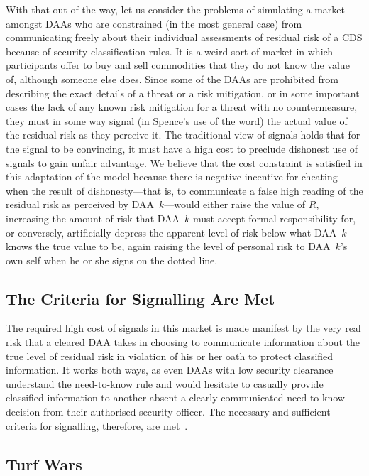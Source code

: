\documentclass{llncs}
\begin{document}
With that out of the way, let us consider the problems of simulating a
market amongst DAAs who are constrained (in the most general case) from
communicating freely about their individual assessments of residual risk
of a CDS because of security classification rules.
It is a weird sort of market in which participants offer to buy and
sell commodities that they do not know the value of, although someone else
does.  Since some of the DAAs are prohibited from describing the exact details
of a threat or a risk mitigation, or in some important cases the lack of
any known risk mitigation for a threat with no countermeasure, they must
in some way signal (in Spence's use of the word) the actual value of the
residual risk as they perceive it.  The traditional view of signals holds
that for the signal to be convincing, it must have a high cost to preclude
dishonest use of signals to gain unfair advantage.  We believe that the cost
constraint is satisfied in this adaptation of the model because there
is negative incentive for cheating when the result of dishonesty---that is,
to communicate
a false high reading of the residual risk as perceived by DAA~$k$---would
either raise the value of $R$, increasing the amount of risk that
DAA~$k$ must accept formal responsibility for, or conversely, artificially
depress the apparent level of risk below what DAA~$k$ knows the true
value to be, again raising the level of personal risk to DAA~$k$'s own self
when he or she signs on the dotted line.

\subsection{The Criteria for Signalling Are Met}

The required high cost of signals in this market is made
manifest by the very real risk that a cleared DAA takes in choosing to
communicate information about the true level of residual risk in violation
of his or her oath to protect classified information.  It works both
ways, as even DAAs with low security clearance understand the need-to-know
rule and would hesitate to casually provide classified information to another
absent a clearly communicated need-to-know decision from their authorised
security officer.  The necessary and sufficient criteria for signalling, therefore, are
met~\cite[pp.\ 499--500 and 367, respectively]{Akerlof1970,Spence1973}.

\subsection{Turf Wars}
\end{document}

